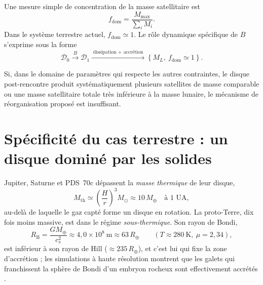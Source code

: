 \documentclass[11pt,a4paper,openany]{report}
\newcommand{\Mt}{M_{\oplus}}
\newcommand{\Rt}{R_{\oplus}}
\begin{document}
Une mesure simple de concentration de la masse satellitaire est
\begin{equation}
f_{\mathrm{dom}}=\frac{M_{\max}}{\sum_i M_i}.
\label{eq:fdom}
\end{equation}
Dans le système terrestre actuel, $f_{\mathrm{dom}}\simeq1$. Le rôle dynamique spécifique de
$B$ s'exprime sous la forme
\begin{equation}
\mathcal{D}_0\xrightarrow{\;B\;}\mathcal{D}_1
\xrightarrow{\;\text{dissipation + accrétion}\;}\left\{M_L,\ f_{\mathrm{dom}}\simeq1\right\}.
\label{eq:roleB}
\end{equation}

\begin{falsif}
Si, dans le domaine de paramètres qui respecte les autres contraintes, le disque post-rencontre
produit systématiquement plusieurs satellites de masse comparable ou une masse satellitaire
totale très inférieure à la masse lunaire, le mécanisme de réorganisation proposé est
insuffisant.
\end{falsif}

\section{Spécificité du cas terrestre : un disque dominé par les solides}
\label{sec:soustherm}

Jupiter, Saturne et PDS~70c dépassent la \emph{masse thermique} de leur disque,
\begin{equation}
M_{\mathrm{th}}\simeq\left(\frac{H}{r}\right)^{3}M_\odot\approx10\,\Mt
\quad\text{à 1 UA},
\label{eq:Mth}
\end{equation}
au-delà de laquelle le gaz capté forme un disque en rotation. La proto-Terre, dix fois moins
massive, est dans le régime \emph{sous-thermique}. Son rayon de Bondi,
\begin{equation}
R_{\mathrm{B}}=\frac{G\Mt}{c_s^2}\approx4{,}0\times10^{8}\ \mathrm{m}\approx63\,\Rt
\qquad(T\approx280\ \mathrm{K},\ \mu=2{,}34),
\label{eq:Bondi}
\end{equation}
est inférieur à son rayon de Hill ($\approx235\,\Rt$), et c'est lui qui fixe la zone
d'accrétion ; les simulations à haute résolution montrent que les galets qui franchissent la
sphère de Bondi d'un embryon rocheux sont effectivement accrétés \cite{Popovas2018}.
\end{document}
